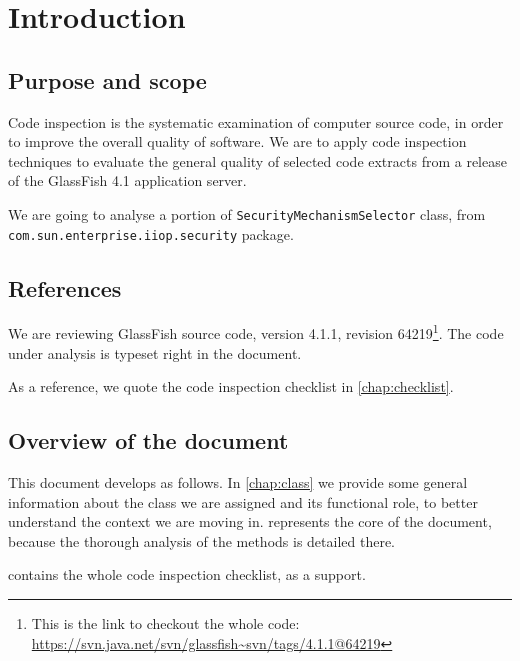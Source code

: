 \chapter{Introduction} \label{chap:introduction}


\section{Purpose and scope}
Code inspection is the systematic examination of computer source code, in order to improve the overall quality of software. We are to apply code inspection techniques to evaluate the general quality of selected code extracts from a release of the GlassFish 4.1 application server.

We are going to analyse a portion of \verb|SecurityMechanismSelector| class, from \verb|com.sun.enterprise.iiop.security| package. 


\section{References}
We are reviewing GlassFish source code, version 4.1.1, revision 64219\footnote{This is the link to checkout the whole code: \url{https://svn.java.net/svn/glassfish~svn/tags/4.1.1@64219}}. The code under analysis is typeset right in the document.

As a reference, we quote the code inspection checklist in \cref{chap:checklist}.


\section{Overview of the document}
This document develops as follows. In \cref{chap:class} we provide some general information about the class we are assigned and its functional role, to better understand the context we are moving in.  represents the core of the document, because the thorough analysis of the methods is detailed there. 

 contains the whole code inspection checklist, as a support.
